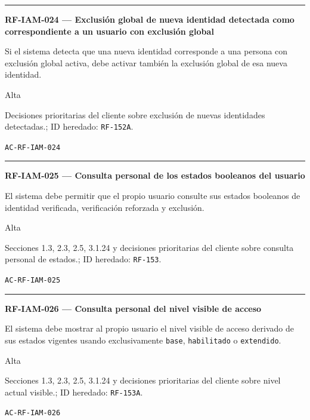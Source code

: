 \documentclass[10pt,letterpaper]{article}
\begin{document}
\vspace{0.25em}\hrule\vspace{0.65em}
\noindent\textbf{RF-IAM-024 --- Exclusión global de nueva identidad detectada como correspondiente a un usuario con exclusión global}\par
\begin{description}[style=nextline,leftmargin=3.15cm,labelwidth=2.8cm,font=\normalfont\bfseries]
\item[Obligación] Si el sistema detecta que una nueva identidad corresponde a una persona con exclusión global activa, debe activar también la exclusión global de esa nueva identidad.
\item[Prioridad] Alta
\item[Procedencia] Decisiones prioritarias del cliente sobre exclusión de nuevas identidades detectadas.; ID heredado: \texttt{RF-152A}.
\item[Verificación] \texttt{AC-RF-IAM-024}
\end{description}
\vspace{0.25em}\hrule\vspace{0.65em}
\noindent\textbf{RF-IAM-025 --- Consulta personal de los estados booleanos del usuario}\par
\begin{description}[style=nextline,leftmargin=3.15cm,labelwidth=2.8cm,font=\normalfont\bfseries]
\item[Obligación] El sistema debe permitir que el propio usuario consulte sus estados booleanos de identidad verificada, verificación reforzada y exclusión.
\item[Prioridad] Alta
\item[Procedencia] Secciones 1.3, 2.3, 2.5, 3.1.24 y decisiones prioritarias del cliente sobre consulta personal de estados.; ID heredado: \texttt{RF-153}.
\item[Verificación] \texttt{AC-RF-IAM-025}
\end{description}
\vspace{0.25em}\hrule\vspace{0.65em}
\noindent\textbf{RF-IAM-026 --- Consulta personal del nivel visible de acceso}\par
\begin{description}[style=nextline,leftmargin=3.15cm,labelwidth=2.8cm,font=\normalfont\bfseries]
\item[Obligación] El sistema debe mostrar al propio usuario el nivel visible de acceso derivado de sus estados vigentes usando exclusivamente \texttt{base}, \texttt{habilitado} o \texttt{extendido}.
\item[Prioridad] Alta
\item[Procedencia] Secciones 1.3, 2.3, 2.5, 3.1.24 y decisiones prioritarias del cliente sobre nivel actual visible.; ID heredado: \texttt{RF-153A}.
\item[Verificación] \texttt{AC-RF-IAM-026}
\end{description}
\end{document}
